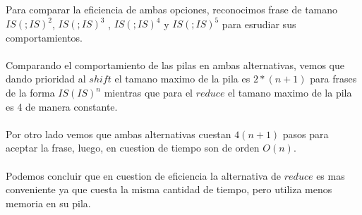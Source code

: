 \documentclass{article}
\begin{document}
\begin{enumerate}
\begin{enumerate}
					Para comparar la eficiencia de ambas opciones, reconocimos frase de tamano $IS(;IS)^{2}$, $IS(;IS)^{3}$ , $IS(;IS)^{4}$ y $IS(;IS)^{5}$ para esrudiar sus comportamientos.
					\\\\
					Comparando el comportamiento de las pilas en ambas alternativas, vemos que dando prioridad al $shift$ el tamano maximo de la pila es $2*(n+1)$ para frases de la forma $IS(IS)^{n}$ mientras que para el $reduce$ el tamano maximo de la pila es 4 de manera constante.
					\\\\
					Por otro lado vemos que ambas alternativas cuestan $4(n + 1)$ pasos para aceptar la frase, luego, en cuestion de tiempo  son de orden $O(n)$.
					\\\\
					Podemos concluir que en cuestion de eficiencia la alternativa de $reduce$ es mas conveniente ya que cuesta la misma cantidad de tiempo, pero utiliza menos memoria en su pila.
					\end{enumerate}
									
			\end{enumerate}
\end{document}
